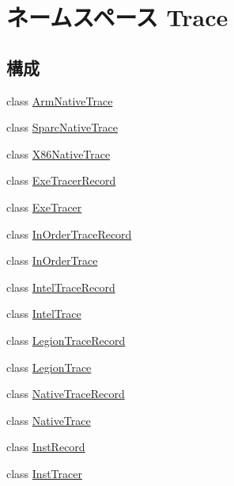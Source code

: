 \hypertarget{namespaceTrace}{
\section{ネームスペース Trace}
\label{namespaceTrace}
}
\subsection*{構成}
\begin{DoxyCompactItemize}
\item 
class \hyperlink{classTrace_1_1ArmNativeTrace}{ArmNativeTrace}
\item 
class \hyperlink{classTrace_1_1SparcNativeTrace}{SparcNativeTrace}
\item 
class \hyperlink{classTrace_1_1X86NativeTrace}{X86NativeTrace}
\item 
class \hyperlink{classTrace_1_1ExeTracerRecord}{ExeTracerRecord}
\item 
class \hyperlink{classTrace_1_1ExeTracer}{ExeTracer}
\item 
class \hyperlink{classTrace_1_1InOrderTraceRecord}{InOrderTraceRecord}
\item 
class \hyperlink{classTrace_1_1InOrderTrace}{InOrderTrace}
\item 
class \hyperlink{classTrace_1_1IntelTraceRecord}{IntelTraceRecord}
\item 
class \hyperlink{classTrace_1_1IntelTrace}{IntelTrace}
\item 
class \hyperlink{classTrace_1_1LegionTraceRecord}{LegionTraceRecord}
\item 
class \hyperlink{classTrace_1_1LegionTrace}{LegionTrace}
\item 
class \hyperlink{classTrace_1_1NativeTraceRecord}{NativeTraceRecord}
\item 
class \hyperlink{classTrace_1_1NativeTrace}{NativeTrace}
\item 
class \hyperlink{classTrace_1_1InstRecord}{InstRecord}
\item 
class \hyperlink{classTrace_1_1InstTracer}{InstTracer}
\end{DoxyCompactItemize}
